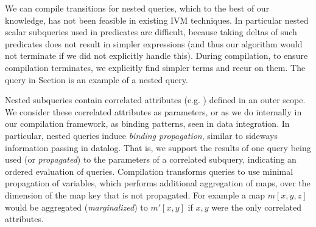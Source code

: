We can compile transitions for nested queries, which to the best of our
knowledge, has not been feasible in existing IVM techniques. In particular
nested scalar subqueries used in predicates are difficult, because taking deltas
of such predicates does not result in simpler expressions (and thus our
algorithm would not terminate if we did not explicitly handle this). During
compilation, to ensure compilation terminates, we explicitly find simpler terms
and recur on them. The  query in Section \todo{[REF]} is an example
of a nested query.

Nested subqueries contain correlated attributes (e.g. )
defined in an outer scope. We consider these correlated attributes as
parameters, or as we do internally in our compilation framework, as binding
patterns, seen in data integration. In particular, nested queries induce
\textit{binding propagation}, similar to sideways information passing in
datalog. That is, we support the results of one query being used (or
\textit{propagated}) to the parameters of a correlated subquery, indicating an
ordered evaluation of queries.
Compilation transforms queries to use minimal propagation of variables, which
performs additional aggregation of maps, over the dimension of the map key that
is not propagated. For example a map $m[x,y,z]$ would be aggregated
(\textit{marginalized}) to $m'[x,y]$ if $x,y$ were the only correlated
attributes.






